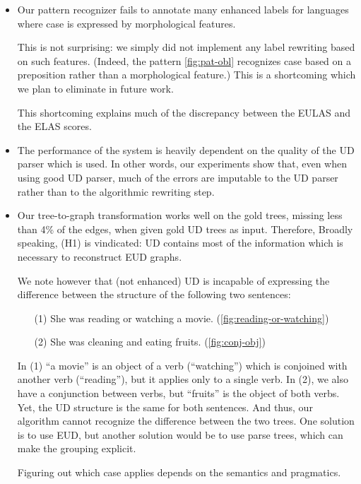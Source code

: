 \documentclass[11pt,a4paper]{article}
\begin{document}
\begin{itemize}
\item
  Our pattern recognizer fails to annotate many enhanced labels
  for languages where case is expressed by morphological features.
  
  This is not surprising: we simply did not implement any label rewriting
  based on such features. (Indeed, the pattern \cref{fig:pat-obl}
  recognizes case based on a preposition rather than a morphological
  feature.) This is a shortcoming which we plan to eliminate in future
  work.

  This shortcoming explains much of the discrepancy between the EULAS
  and the ELAS scores.
  
\item The performance of the system is heavily dependent on the
  quality of the UD parser which is used. In other words, our
  experiments show that, even when using good UD parser, much of the
  errors are imputable to the UD parser rather than to the algorithmic
  rewriting step.

\item Our tree-to-graph transformation works well on the gold trees,
  missing less than 4\% of the edges, when given gold UD trees as input.
  Therefore, Broadly speaking, (H1) is vindicated: UD contains most of
  the information which is necessary to reconstruct EUD graphs.

  We note however that (not enhanced) UD is incapable of expressing
  the difference between the structure of the following two sentences:
  
  \begin{itemize}
    \item[(1)] She was reading or watching a movie. (\cref{fig:reading-or-watching})
    \item[(2)] She was cleaning and eating fruits. (\cref{fig:conj-obj})
  \end{itemize}
  In (1) ``a movie'' is an object of a verb (``watching'') which
  is conjoined with another verb (``reading''), but it applies only
  to a single verb. In (2), we also have a conjunction between
  verbs, but ``fruits'' is the object of both verbs. Yet, the UD
  structure is the same for both sentences. And thus, our algorithm
  cannot recognize the difference between the two trees.  One
  solution is to use EUD, but another solution would be to use
  parse trees, which can make the grouping explicit.

  Figuring out which case applies depends on the semantics and
  pragmatics.


\end{itemize}
\end{document}

